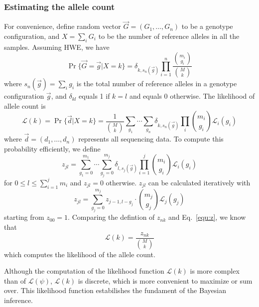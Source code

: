 \documentclass{bioinfo}
\begin{document}
\begin{methods}
\subsubsection{Estimating the allele count}
For convenience, define random vector $\vec{G}=(G_1,\ldots,G_n)$ to be a
genotype configuration, and $X=\sum_iG_i$ to be the number of reference
alleles in all the samples.  Assuming HWE, we have
$$
\Pr\{\vec{G}=\vec{g}|X=k\}=\delta_{k,s_n(\vec{g})}\prod_{i=1}^n\frac{\binom{m_i}{g_i}}{\binom{M}{k}}
$$
where $s_n(\vec{g})=\sum_i g_i$ is the total number of reference alleles in a
genotype configuration $\vec{g}$, and $\delta_{kl}$ equals 1 if $k=l$ and
equals 0 otherwise. The likelihood of allele count is
\begin{equation}\label{equ:klk}
\mathcal{L}(k)=\Pr\{\vec{d}|X=k\}=\frac{1}{\binom{M}{k}}\sum_{g_1}\cdots\sum_{g_n}\delta_{k,s_n(\vec{g})}\prod_i\binom{m_i}{g_i}\mathcal{L}_i(g_i)
\end{equation}
where $\vec{d}=(d_1,\ldots,d_n)$ represents all sequencing data. To compute
this probability efficiently, we define
\begin{equation}\label{eq:z-def}
z_{jl}=\sum_{g_1=0}^{m_1}\cdots\sum_{g_j=0}^{m_j}\delta_{l,s_j(\vec{g})}\prod_{i=1}^j\binom{m_i}{g_i}\mathcal{L}_i(g_i)
\end{equation}
for $0\le l\le \sum_{i=1}^jm_i$ and $z_{jl}=0$ otherwise. $z_{jl}$ can be
calculated iteratively with
\begin{equation}\label{equ:z}
z_{jl}=\sum_{g_j=0}^{m_j}z_{j-1,l-g_j}\cdot\binom{m_j}{g_j}\mathcal{L}_j(g_j)
\end{equation}
starting from $z_{00}=1$. Comparing the defintion of $z_{nk}$ and
Eq.~\eqref{equ:z}, we know that
\begin{equation}\label{equ:klk2}
\mathcal{L}(k)=\frac{z_{nk}}{\binom{M}{k}}
\end{equation}
which computes the likelihood of the allele count.

Although the computation of the likelihood function $\mathcal{L}(k)$ is more
complex than of $\mathcal{L}(\psi)$, $\mathcal{L}(k)$ is discrete, which is
more convenient to maximize or sum over. This likelihood function estabilishes
the fundament of the Bayesian inference.


\end{methods}
\end{document}
